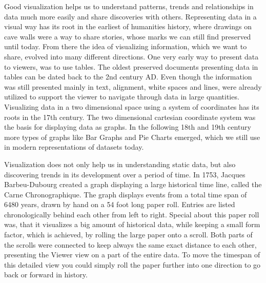 Good visualization helps us to understand patterns, trends and relationships in
data much more easily and share discoveries with others. Representing data in a
visual way has its root in the earliest of humanities history, where drawings on
cave walls were a way to share stories, whose marks we can still find
preserved until today. From there the idea of visualizing information, which we
want to share, evolved into many different directions. One very early way to
present data to viewers, was to use tables. The oldest preserved documents
presenting data in tables can be dated back to the 2nd century AD. Even though
the information was still presented mainly in text, alignment, white spaces and
lines, were already utilized to support the viewer to navigate through data in
large quantities.  Visualizing data in a two dimensional space using a system of
coordinates has its roots in the 17th century. The two dimensional cartesian
coordinate system was the basis for displaying data as graphs. In the following
18th and 19th century more types of graphs like Bar Graphs and Pie Charts
emerged, which we still use in modern representations of datasets today.
\cite{DataVisHistory}

Visualization does not only help us in understanding static data, but also
discovering trends in its development over a period of time. In 1753, Jacques
Barbeu-Dubourg created a graph displaying a large historical time line, called
the Carne Chronographique. The graph displays events from a total time span of
6480 years, drawn by hand on a 54 foot long paper roll. Entries are listed
chronologically behind each other from left to right. Special about this paper
roll was, that it visualizes a big amount of historical data, while keeping a
small form factor, which is achieved, by rolling the large paper onto a scroll.
Both parts of the scrolls were connected to keep always the same exact distance
to each other, presenting the Viewer view on a part of the entire data. To move
the timespan of this detailed view you could simply roll the paper further into
one direction to go back or forward in history.
\cite{DataVisHistPresentation}

